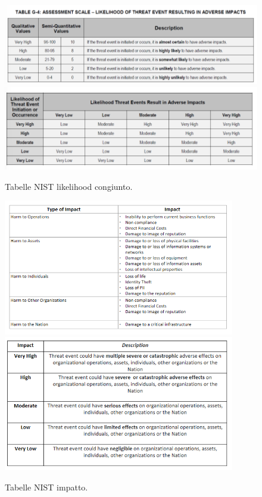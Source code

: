 \begin{figure}
    \centering
    \includegraphics[width=1\textwidth]{images/11-3.png}
    \includegraphics[width=1\textwidth]{images/11-4.png}
    \caption{Tabelle NIST likelihood congiunto.}
    \label{fig:11-5}
\end{figure}

\begin{figure}
    \centering
    \includegraphics[width=0.9\textwidth]{images/11-5.png}
    \includegraphics[width=0.9\textwidth]{images/11-6.png}
    \caption{Tabelle NIST impatto.}
    \label{fig:11-2}
\end{figure}

